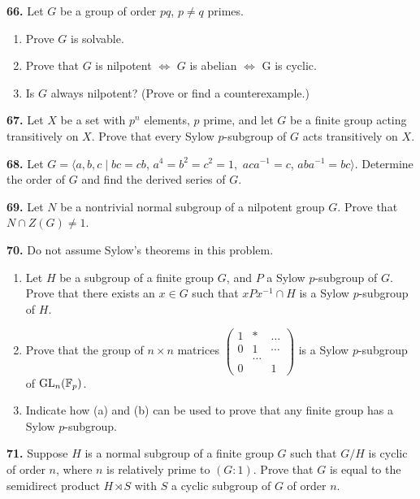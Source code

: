 \documentclass[a4paper,11pt,final,openany]{memoir}%
\theoremstyle{nonumberplain}
\begin{document}
\medskip\noindent\textbf{66.} Let $G$ be a group of order $pq$, $p\neq q$ primes.

\begin{enumerate}
\item Prove $G$ is solvable.

\item Prove that $G$ is nilpotent $\iff$ $G$ is abelian $\iff$ G is cyclic.

\item Is $G$ always nilpotent? (Prove or find a counterexample.)
\end{enumerate}

\medskip\noindent\textbf{67.} Let $X$ be a set with $p^{n}$ elements, $p$
prime, and let $G$ be a finite group acting transitively on $X$. Prove that
every Sylow $p$-subgroup of $G$ acts transitively on $X$.

\medskip\noindent\textbf{68.} Let $G=\langle a,b,c\mid bc=cb$, $a^{4}%
=b^{2}=c^{2}=1,$ $aca^{-1}=c$, $aba^{-1}=bc\rangle$. Determine the order of
$G$ and find the derived series of $G$.

\medskip\noindent\textbf{69.} Let $N$ be a nontrivial normal subgroup of a
nilpotent group $G$. Prove that $N\cap Z(G)\neq1$.

\medskip\noindent\textbf{70.} Do not assume Sylow's theorems in this problem.

\begin{enumerate}
\item Let $H$ be a subgroup of a finite group $G$, and $P$ a Sylow
$p$-subgroup of $G$. Prove that there exists an $x\in G$ such that
$xPx^{-1}\cap H$ is a Sylow $p$-subgroup of $H$.

\item Prove that the group of $n\times n$ matrices $%
\begin{pmatrix}
1 & \ast & \ldots\\
0 & 1 & \cdots\\
& \ldots & \\
0 &  & 1
\end{pmatrix}
$ is a Sylow $p$-subgroup of $\operatorname{GL}_{n}(\mathbb{F}_{p})$.

\item Indicate how (a) and (b) can be used to prove that any finite group has
a Sylow $p$-subgroup.
\end{enumerate}

\medskip\noindent\textbf{71.} Suppose $H$ is a normal subgroup of a finite
group $G$ such that $G/H$ is cyclic of order $n$, where $n$ is relatively
prime to $(G:1)$. Prove that $G$ is equal to the semidirect product $H\rtimes
S$ with $S$ a cyclic subgroup of $G$ of order $n$.
\end{document}
